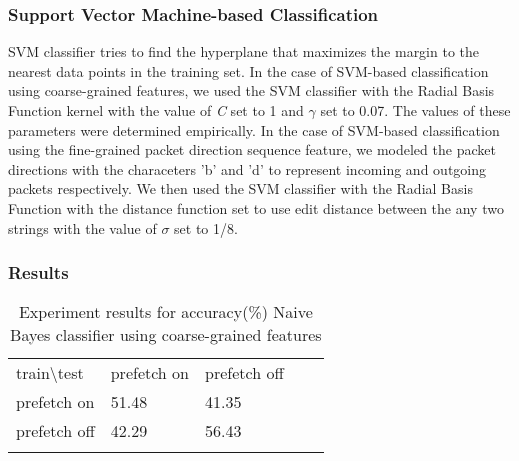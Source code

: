 \subsubsection{Support Vector Machine-based Classification}
SVM classifier tries to find the hyperplane that maximizes the margin to the nearest data points in the training set. 
In the case of SVM-based classification using coarse-grained features, we used the SVM classifier with the Radial Basis Function kernel with the value of \textit{C} set to 1 and $\gamma$ set to 0.07. The values of these parameters were determined empirically. 
In the case of SVM-based classification using the fine-grained packet direction sequence feature, we modeled the packet directions with the characeters 'b' and 'd' to represent incoming and outgoing packets respectively. 
We then used the SVM classifier with the Radial Basis Function with the distance function set to use edit distance between the any two strings with the value of $\sigma$ set to 1/8. 

\subsubsection{Results}
\begin{table}[]
\centering
\caption{Experiment results for accuracy(\%) Naive Bayes classifier using coarse-grained features}
\label{table:rq1-nb}
\begin{tabular}{lllll}
\cline{1-3}
\multicolumn{1}{|l|}{train\textbackslash test} & \multicolumn{1}{l|}{prefetch on} & \multicolumn{1}{l|}{prefetch off} &  &  \\ \cline{1-3}
\multicolumn{1}{|l|}{prefetch on}                    & \multicolumn{1}{l|}{51.48}         & \multicolumn{1}{l|}{41.35}          &  &  \\ \cline{1-3}
\multicolumn{1}{|l|}{prefetch off}                   & \multicolumn{1}{l|}{42.29}         & \multicolumn{1}{l|}{56.43}          &  &  \\ \cline{1-3}
                                                     &                                  &                                   &  & 
\end{tabular}                  
\end{table}

